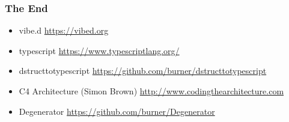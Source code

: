 \documentclass[xelatex,13pt]{beamer}
\begin{document}
\begin{frame}
	\frametitle{The End}
	\begin{itemize}
		\item vibe.d \url{https://vibed.org}
		\item typescript \url{https://www.typescriptlang.org/}
		\item dstructtotypescript
			\url{https://github.com/burner/dstructtotypescript}
		\item C4 Architecture (Simon Brown) \url{http://www.codingthearchitecture.com}
		\item Degenerator \url{https://github.com/burner/Degenerator}
	\end{itemize}
\end{frame}
\end{document}
